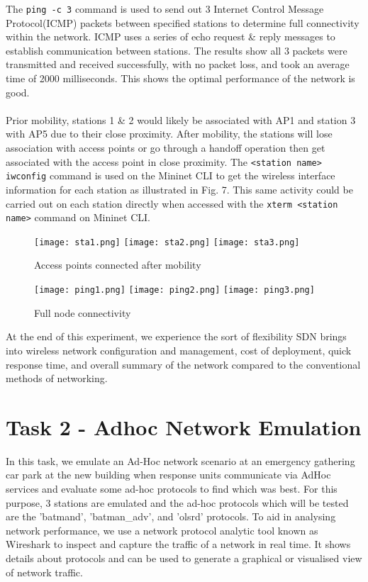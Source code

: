 \documentclass{article}
\begin{document}
\par The \texttt{ping -c 3} command is used to send out 3 Internet Control Message Protocol(ICMP) \citep{1010101} packets between specified stations to determine full connectivity within the network. ICMP uses a series of echo request \& reply messages to establish communication between stations. The results show all 3 packets were transmitted and received successfully, with no packet loss, and took an average time of 2000 milliseconds. This shows the optimal performance of the network is good. \\\\ Prior mobility, stations 1 \& 2 would likely be associated with AP1 and station 3 with AP5 due to their close proximity. After mobility, the stations will lose association with access points or go through a handoff operation then get associated with the access point in close proximity. The \texttt{<station name> iwconfig} command is used on the Mininet CLI to get the wireless interface information for each station as illustrated in Fig. 7. This same activity could be carried out on each station directly when accessed with the \texttt{xterm <station name>} command on Mininet CLI. 
	\begin{figure}[h]
			\centering
        			\texttt{[image: sta1.png]}
        			\texttt{[image: sta2.png]}
        			\texttt{[image: sta3.png]}
        			\caption{Access points connected after mobility}
        			\label{fig:t1-5}
        		\endminipage\vspace{10pt}
			\centering
        			\texttt{[image: ping1.png]}
        			\texttt{[image: ping2.png]}
       			\texttt{[image: ping3.png]}
        			\caption{Full node connectivity}
        			\label{fig:t1-6}
        		\endminipage
    	\end{figure}
\par At the end of this experiment, we experience the sort of flexibility SDN brings into wireless network configuration and management, cost of deployment,  quick response time, and overall summary of the network compared to the conventional methods of networking.
	
\newpage
\section{Task 2 - Adhoc Network Emulation}
In this task, we emulate an Ad-Hoc network scenario at an emergency gathering car park at the new building when response units communicate via AdHoc services and evaluate some ad-hoc protocols to find which was best. For this purpose, 3 stations are emulated and the ad-hoc protocols which will be tested are the 'batmand', 'batman\_adv', and 'olsrd' protocols. To aid in analysing network performance, we use a network protocol analytic tool known as Wireshark to inspect and capture the traffic of a network in real time. It shows details about protocols and can be used to generate a graphical or visualised view of network traffic.
\end{document}
